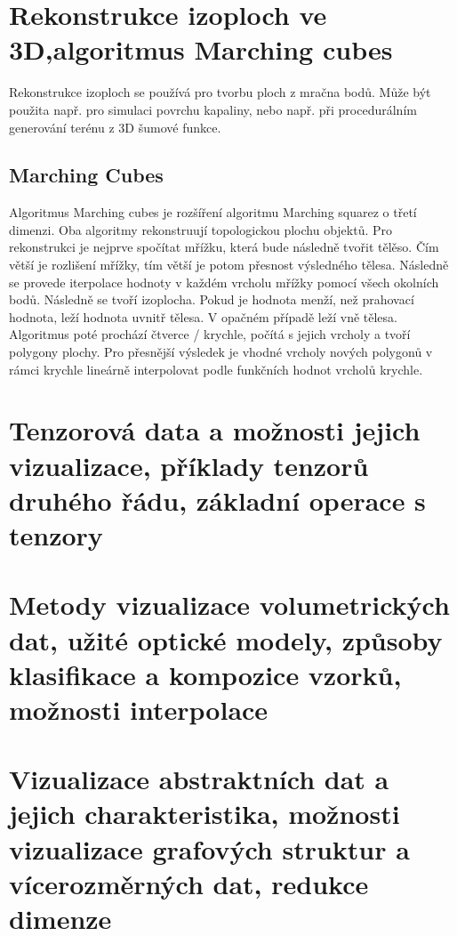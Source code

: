 \documentclass[10pt,a4paper, table]{article}
\begin{document}
\clearpage
\section{Rekonstrukce izoploch ve 3D,algoritmus Marching cubes}
Rekonstrukce izoploch se používá pro tvorbu ploch z mračna bodů. Může být použita např. pro simulaci povrchu kapaliny, nebo např. při procedurálním generování terénu z 3D šumové funkce.
\subsection{Marching Cubes}
Algoritmus Marching cubes je rozšíření algoritmu Marching squarez o třetí dimenzi. Oba algoritmy rekonstruují topologickou plochu objektů. Pro rekonstrukci je nejprve spočítat mřížku, která bude následně tvořit tělěso. Čím větší je rozlišení mřížky, tím větší je potom přesnost výsledného tělesa. Následně se provede iterpolace hodnoty v každém vrcholu mřížky pomocí všech okolních bodů. Následně se tvoří izoplocha. Pokud je hodnota menží, než prahovací hodnota, leží hodnota uvnitř tělesa. V opačném případě leží vně tělesa. Algoritmus poté prochází čtverce / krychle, počítá s jejich vrcholy a tvoří polygony plochy. Pro přesnější výsledek je vhodné vrcholy nových polygonů v rámci krychle lineárně interpolovat podle funkčních hodnot vrcholů krychle.
\section{Tenzorová data a možnosti jejich vizualizace, příklady tenzorů druhého řádu, základní operace s tenzory}

\section{Metody  vizualizace volumetrických dat, užité optické modely, způsoby klasifikace  a kompozice vzorků, možnosti interpolace}

\section{Vizualizace  abstraktních dat a  jejich  charakteristika, možnosti vizualizace grafových struktur a vícerozměrných dat, redukce dimenze}
\end{document}
